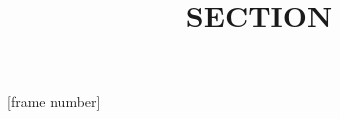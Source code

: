 \makeatletter
\g@addto@macro{\UrlBreaks}{\UrlOrds}
\makeatother


\usepackage{longdivision}
\usepackage{scalerel}
\setcounter{MaxMatrixCols}{20}
\newcommand{\longdiv}{\smash{\mkern-0.43mu\vstretch{1.31}{\hstretch{.7}{)}}\mkern-5.2mu\vstretch{1.31}{\hstretch{.7}{)}}}}


\def \NN {{\mathbb N}}
\def \CC {{\mathbb C}}
\def \RR {{\mathbb R}}
\def \QQ {{\mathbb Q}}
\def \H {{\mathbb H}}
\def \FF {{\mathbb F}}
\def \ZZ {{\mathbb Z}}
\def \a {{\mathfrak a}}
\def \b {{\mathfrak b}}
\def \p {{\mathfrak p}}
\def \Pf {{\mathfrak P}}

\def \tta {{\texttt A}}
\def \ttb {{\texttt B}}
\def \ttc {{\texttt C}}
\def \ttd {{\texttt D}}
\def \ttf {{\texttt F}}
\def \m {{\mathfrak m}}

\DeclareMathOperator*{\argmax}{arg\,max}%
\DeclareMathOperator*{\argmin}{arg\,min}%

\newcommand{\mo}{\textrm{~mod~}}
\newcommand{\ord}[1]{\textrm{ord}(#1)}
\newcommand{\node}[2]{``\texttt{#1} \ (#2)\textnormal{''}}
\newcommand{\picsrc}[1]{\text{{\tiny src: \url{#1}}}}
\newcommand{\cov}[1]{\textrm{Cov}{\left(#1\right)}}
\newcommand{\var}[1]{\textrm{Var}{\left(#1\right)}}
\newcommand{\ex}[1]{\textrm{E}\left[#1\right]}
\newcommand{\wt}[1]{\textrm{wt}\left(#1\right)}
\newcommand{\dis}[1]{\textrm{dis}\left(#1\right)}

\newcommand{\datafixone}{\textit{Fixed dataset A}\xspace}
\newcommand{\datafixtwo}{\textit{Fixed dataset B}\xspace}
\newcommand{\dataranone}{\textit{Random plaintext dataset}\xspace}
\newcommand{\datarantwo}{\textit{Random dataset}\xspace}


[frame number]



\title{{\Huge \SectionName} \texorpdfstring{\\ \vspace{1cm} {\normalsize SECTION \SectionNumber}}{}}

\date{}



